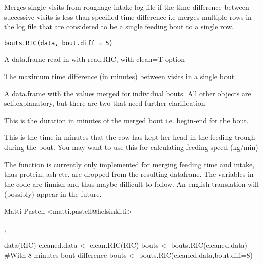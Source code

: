\documentclass{book}
\begin{document}
\begin{Description}\relax
Merges single visits from roughage intake log file if the time
difference between successive visits is less than specified time
difference i.e merges multiple rows in the log file that are considered
to be a single feeding bout to a single row.
\end{Description}
\begin{Usage}
\begin{verbatim}
bouts.RIC(data, bout.diff = 5)
\end{verbatim}
\end{Usage}
\begin{Arguments}
\begin{ldescription}
\item[\code{data}] A data.frame read in with read.RIC, with clean=T option
\item[\code{bout.diff}] The maximum time difference (in minutes) between visits in a
single bout
\end{ldescription}
\end{Arguments}
\begin{Value}
A data.frame with the values merged for individual bouts. All other
objects are self.explanatory, but there are two that need further
clarification  
\begin{ldescription}
\item[\code{bout.duration}] This is the duration in minutes of the merged bout
i.e. begin-end for the bout.
\item[\code{intake.duration}] This is the time in minutes that the cow has kept her head
in the feeding trough during the bout. You may want to use this for
calculating feeding speed (kg/min)
\end{ldescription}
\end{Value}
\begin{Note}\relax
The function is currently only implemented for merging feeding
time and intake, thus protein, ash etc. are dropped from the resulting
datafrane. The variables in the code are finnish and thus maybe difficult to
follow. An english translation will (possibly) appear in the future.
\end{Note}
\begin{Author}\relax
Matti Pastell <matti.pastell@helsinki.fi>
\end{Author}
\begin{SeeAlso}\relax
{}, 
\end{SeeAlso}
\begin{Examples}
\begin{ExampleCode}
data(RIC)
cleaned.data <- clean.RIC(RIC)
bouts <- bouts.RIC(cleaned.data)
#With 8 minutes bout difference
bouts <- bouts.RIC(cleaned.data,bout.diff=8)
\end{ExampleCode}
\end{Examples}
\end{document}
